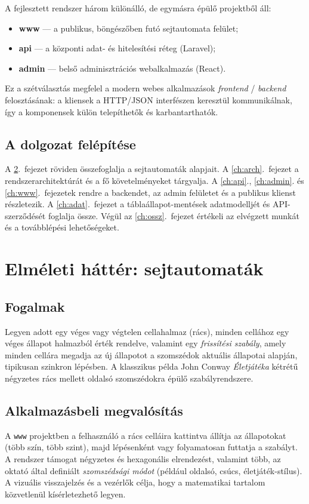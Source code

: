 \documentclass[12pt,a4paper,openany]{book}
\begin{document}
A fejlesztett rendszer három különálló, de egymásra épülő projektből áll:
\begin{itemize}
  \item \textbf{www} — a publikus, böngészőben futó sejtautomata felület;
  \item \textbf{api} — a központi adat- és hitelesítési réteg (Laravel);
  \item \textbf{admin} — belső adminisztrációs webalkalmazás (React).
\end{itemize}
Ez a szétválasztás megfelel a modern webes alkalmazások \emph{frontend} / \emph{backend} felosztásának: a kliensek a HTTP/JSON interfészen keresztül kommunikálnak, így a komponensek külön telepíthetők és karbantarthatók.

\section{A dolgozat felépítése}
A \ref{ch:elm}.\ fejezet röviden összefoglalja a sejtautomaták alapjait. A \ref{ch:arch}.\ fejezet a rendszerarchitektúrát és a fő követelményeket tárgyalja. A \ref{ch:api}., \ref{ch:admin}. és \ref{ch:www}.\ fejezetek rendre a backendet, az admin felületet és a publikus klienst részletezik. A \ref{ch:adat}.\ fejezet a táblaállapot-mentések adatmodelljét és API-szerződését foglalja össze. Végül az \ref{ch:ossz}.\ fejezet értékeli az elvégzett munkát és a továbblépési lehetőségeket.

\chapter{Elméleti háttér: sejtautomaták}
\label{ch:elm}

\section{Fogalmak}
Legyen adott egy véges vagy végtelen cellahalmaz (rács), minden cellához egy véges állapot halmazból érték rendelve, valamint egy \emph{frissítési szabály}, amely minden cellára megadja az új állapotot a szomszédok aktuális állapotai alapján, tipikusan szinkron lépésben. A klasszikus példa John Conway \emph{Életjátéka} kétrétű négyzetes rács mellett oldalsó szomszédokra épülő szabályrendszere.

\section{Alkalmazásbeli megvalósítás}
A \texttt{www} projektben a felhasználó a rács celláira kattintva állítja az állapotokat (több szín, több szint), majd lépésenként vagy folyamatosan futtatja a szabályt. A rendszer támogat négyzetes és hexagonális elrendezést, valamint több, az oktató által definiált \emph{szomszédsági módot} (például oldalsó, csúcs, életjáték-stílus). A vizuális visszajelzés és a vezérlők célja, hogy a matematikai tartalom közvetlenül kísérletezhető legyen.
\end{document}
